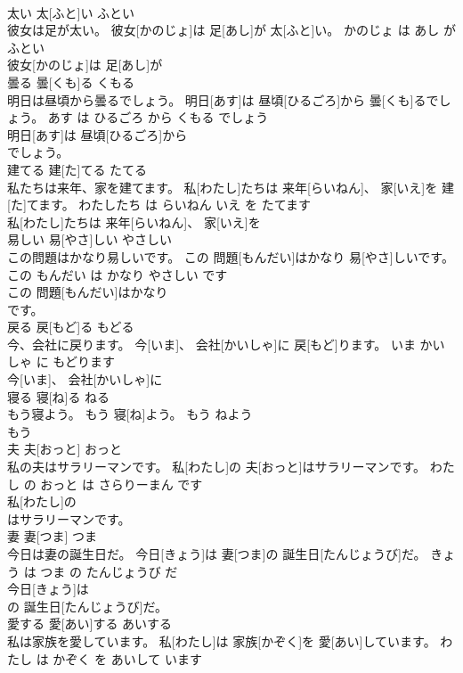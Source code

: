 \documentclass[8pt]{extreport}
\begin{document}
\begin{CJK}{UTF8}{min}
\\	太い	太[ふと]い	ふとい	
\\	彼女は足が太い。	彼女[かのじょ]は 足[あし]が 太[ふと]い。	かのじょ は あし が ふとい	
\\	彼女[かのじょ]は 足[あし]が
\\	曇る	曇[くも]る	くもる	
\\	明日は昼頃から曇るでしょう。	明日[あす]は 昼頃[ひるごろ]から 曇[くも]るでしょう。	あす は ひるごろ から くもる でしょう	
\\	明日[あす]は 昼頃[ひるごろ]から
\\	でしょう。			
\\	建てる	建[た]てる	たてる	
\\	私たちは来年、家を建てます。	私[わたし]たちは 来年[らいねん]、 家[いえ]を 建[た]てます。	わたしたち は らいねん いえ を たてます	
\\	私[わたし]たちは 来年[らいねん]、 家[いえ]を
\\	易しい	易[やさ]しい	やさしい	
\\	この問題はかなり易しいです。	この 問題[もんだい]はかなり 易[やさ]しいです。	この もんだい は かなり やさしい です	
\\	この 問題[もんだい]はかなり
\\	です。			
\\	戻る	戻[もど]る	もどる	
\\	今、会社に戻ります。	今[いま]、 会社[かいしゃ]に 戻[もど]ります。	いま かいしゃ に もどります	
\\	今[いま]、 会社[かいしゃ]に
\\	寝る	寝[ね]る	ねる	
\\	もう寝よう。	もう 寝[ね]よう。	もう ねよう	
\\	もう
\\	夫	夫[おっと]	おっと	
\\	私の夫はサラリーマンです。	私[わたし]の 夫[おっと]はサラリーマンです。	わたし の おっと は さらりーまん です	
\\	私[わたし]の
\\	はサラリーマンです。			
\\	妻	妻[つま]	つま	
\\	今日は妻の誕生日だ。	今日[きょう]は 妻[つま]の 誕生日[たんじょうび]だ。	きょう は つま の たんじょうび だ	
\\	今日[きょう]は
\\	の 誕生日[たんじょうび]だ。			
\\	愛する	愛[あい]する	あいする	
\\	私は家族を愛しています。	私[わたし]は 家族[かぞく]を 愛[あい]しています。	わたし は かぞく を あいして います	

\end{CJK}
\end{document}
